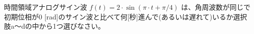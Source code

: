 時間領域アナログサイン波 $f(t) = 2 \cdot \sin( \pi \cdot t + \pi/4 )$ は、角周波数が同じで初期位相が$0$ [rad]のサイン波と比べて何[秒]進んで(あるいは遅れて)いるか選択肢a〜dの中から1つ選びなさい。
